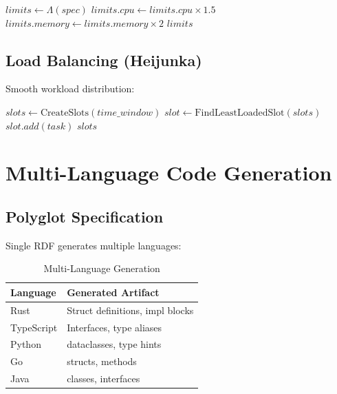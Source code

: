 \begin{algorithm}
\caption{Adaptive Resource Allocation}
\begin{algorithmic}[1]
    \State $limits \gets \Lambda(spec)$
        \State $limits.cpu \gets limits.cpu \times 1.5$
    \EndIf
        \State $limits.memory \gets limits.memory \times 2$
    \EndIf
    \State \Return $limits$
\EndProcedure
\end{algorithmic}
\end{algorithm}

\subsection{Load Balancing (Heijunka)}

Smooth workload distribution:

\begin{algorithm}
\caption{Heijunka Smoothing}
\begin{algorithmic}[1]
    \State $slots \gets \text{CreateSlots}(time\_window)$
        \State $slot \gets \text{FindLeastLoadedSlot}(slots)$
        \State $slot.add(task)$
    \EndFor
    \State \Return $slots$
\EndProcedure
\end{algorithmic}
\end{algorithm}

\section{Multi-Language Code Generation}

\subsection{Polyglot Specification}

Single RDF generates multiple languages:

\begin{table}[h]
\centering
\caption{Multi-Language Generation}
\begin{tabular}{ll}
\toprule
\textbf{Language} & \textbf{Generated Artifact} \\
\midrule
Rust & Struct definitions, impl blocks \\
TypeScript & Interfaces, type aliases \\
Python & dataclasses, type hints \\
Go & structs, methods \\
Java & classes, interfaces \\
\bottomrule
\end{tabular}
\end{table}

